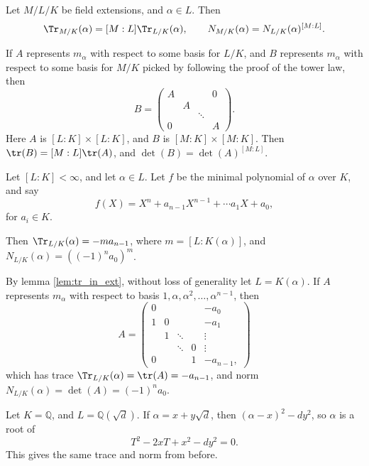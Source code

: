 \documentclass[12pt]{article}
\begin{document}
\begin{lemma}\label{lem:tr_in_ext}
	Let $M/L/K$ be field extensions, and $\alpha \in L$. Then
	\[
		\Tr_{M/K}(\alpha) = [M:L] \Tr_{L/K}(\alpha), \qquad N_{M/K}(\alpha) = N_{L/K}(\alpha)^{[M:L]}.
	\]
\end{lemma}

\begin{proofbox}
	If $A$ represents $m_\alpha$ with respect to some basis for $L/K$, and $B$ represents $m_\alpha$ with respect to some basis for $M/K$ picked by following the proof of the tower law, then
	\[
	B=
	\begin{pmatrix}
		A &&& 0 \\
		  &A&& \\
		  &&\ddots&\\
		0&&&A
	\end{pmatrix}.
	\]
	Here $A$ is $[L:K]\times[L:K]$, and $B$ is $[M:K] \times [M:K]$. Then $\tr(B) = [M:L] \tr(A)$, and $\det(B) = \det(A)^{[M:L]}$.
\end{proofbox}

\begin{theorem}
	Let $[L:K] < \infty$, and let $\alpha \in L$. Let $f$ be the minimal polynomial of $\alpha$ over $K$, and say
	\[
	f(X) = X^{n} + a_{n-1}X^{n-1} + \cdots a_1X + a_0,
	\]
	for $a_i \in K$.

	Then $\Tr_{L/K}(\alpha) = - m a_{n-1}$, where $m = [L:K(\alpha)]$, and $N_{L/K}(\alpha) = ((-1)^{n}a_0)^{m}$.
\end{theorem}

\begin{proofbox}
	By lemma \ref{lem:tr_in_ext}, without loss of generality let $L = K(\alpha)$. If $A$ represents $m_\alpha$ with respect to basis $1, \alpha, \alpha^2, \ldots, \alpha^{n-1}$, then
	\[
	A =
	\begin{pmatrix}
		0 & & & & -a_{0} \\
		1 & 0 & & & -a_{1} \\
		  & 1 & \ddots & & \vdots \\
		  & & \ddots & 0 &\vdots \\
		0 & & & 1 & -a_{n-1},
	\end{pmatrix}
	\]
	which has trace $\Tr_{L/K}(\alpha) = \tr(A) = -a_{n-1}$, and norm $N_{L/K}(\alpha) = \det (A) = (-1)^{n} a_0$.
\end{proofbox}

\begin{exbox}
	Let $K = \mathbb{Q}$, and $L = \mathbb{Q}(\sqrt d)$. If $\alpha = x + y \sqrt d$, then $(\alpha - x)^2 - dy^2$, so $\alpha$ is a root of
	\[
	T^2 - 2x T + x^2 - dy^2 = 0.
	\]
	This gives the same trace and norm from before.
\end{exbox}
\end{document}
